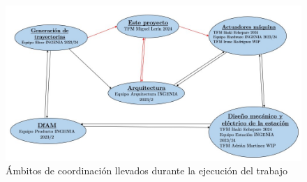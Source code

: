 \begin{figure}[h!]
    \centering
    \includegraphics[scale=0.6]{figuras/ambitos_coordinacion_1_esquema_v2.jpg}
    \caption{Ámbitos de coordinación llevados durante la ejecución del trabajo}
    \label{fig:ambitos_coordinacion}
\end{figure}

\phantom{Este texto no se verá, pero ocupará espacio. Lo uso para que la figura de los ámbitos de coordinación quede al comienzo de la página}